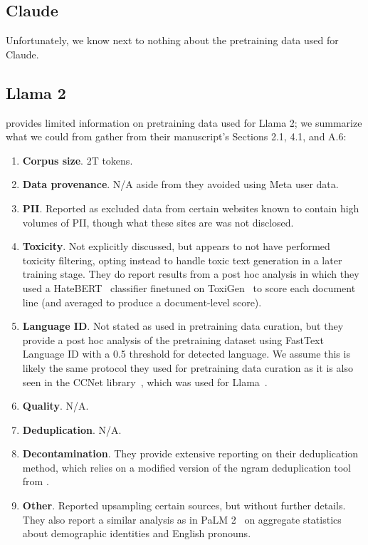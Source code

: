 \subsection{Claude~\citep{claude-announce}}\label{appendix:llm:claude} 

Unfortunately, we know next to nothing about the pretraining data used for Claude. 


\subsection{Llama 2~\citep{Touvron2023Llama2O}}\label{appendix:llm:llama2} 

\citet{Touvron2023Llama2O} provides limited information on pretraining data used for Llama 2; we summarize what we could from gather from their manuscript's Sections 2.1, 4.1, and A.6:


\begin{enumerate}
    \item \textbf{Corpus size}. 2T tokens.
    \item \textbf{Data provenance}. N/A aside from they avoided using Meta user data.
    \item \textbf{PII}. Reported as excluded data from certain websites known to contain high volumes of PII, though what these sites are was not disclosed.
    \item \textbf{Toxicity}. Not explicitly discussed, but appears to not have performed toxicity filtering, opting instead to handle toxic text generation in a later training stage. They do report results from a post hoc analysis in which they used a HateBERT~\citep{caselli-etal-2021-hatebert} classifier finetuned on ToxiGen~\citep{hartvigsen-etal-2022-toxigen} to score each document line (and averaged to produce a document-level score).
    \item \textbf{Language ID}. Not stated as used in pretraining data curation, but they provide a post hoc analysis of the pretraining dataset using FastText Language ID with a 0.5 threshold for detected language. We assume this is likely the same protocol they used for pretraining data curation as it is also seen in the CCNet library~\citep{wenzek-etal-2020-ccnet}, which was used for Llama~\citep{Touvron2023LLaMAOA}.
    \item \textbf{Quality}. N/A.
    \item \textbf{Deduplication}. N/A.
    \item \textbf{Decontamination}. They provide extensive reporting on their deduplication method, which relies on a modified version of the ngram deduplication tool from \citet{lee-etal-2022-deduplicating}.
    \item \textbf{Other}. Reported upsampling certain sources, but without further details. They also report a similar analysis as in PaLM 2~\citep{Anil2023PaLM2T} on aggregate statistics about demographic identities and English pronouns.
\end{enumerate}




